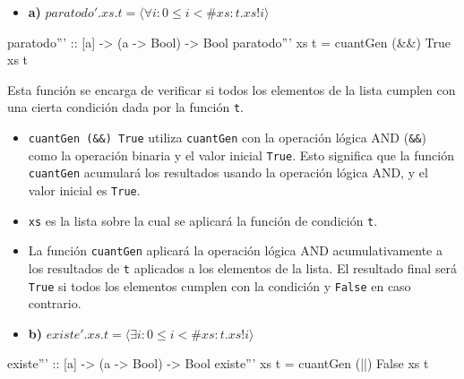\documentclass{article}
\begin{document}
\begin{itemize}
    \item 
    \textbf{a)} $paratodo'.xs.t = \langle \forall i : 0 \leq i < \#xs : t.xs!i  \rangle $
    \end{itemize}
    \begin{haskell}
    paratodo''' :: [a] -> (a -> Bool) -> Bool
    paratodo''' xs t = cuantGen (&&) True xs t
    \end{haskell}
    
    Esta función se encarga de verificar si todos los elementos de la lista cumplen con una cierta condición dada por la función \verb|t|.
    \begin{itemize}
    \item 
    \verb|cuantGen (&&) True| utiliza \verb|cuantGen| con la operación lógica AND (\verb|&&|) como la operación binaria y el valor inicial \verb|True|. Esto significa que la función \verb|cuantGen| acumulará los resultados usando la operación lógica AND, y el valor inicial es \verb|True|.
    \item 
    \verb|xs| es la lista sobre la cual se aplicará la función de condición \verb|t|.
    \item 
    La función \verb|cuantGen| aplicará la operación lógica AND acumulativamente a los resultados de \verb|t| aplicados a los elementos de la lista. El resultado final será \verb|True| si todos los elementos cumplen con la condición y \verb|False| en caso contrario.
\end{itemize}
\begin{itemize}
    \item 
    \textbf{b)} $existe'.xs.t = \langle \exists i : 0 \leq i < \#xs : t.xs!i  \rangle $
    \end{itemize}
    \begin{haskell}
    existe''' :: [a] -> (a -> Bool) -> Bool
    existe''' xs t = cuantGen (||) False xs t
    \end{haskell}
    
\end{document}
